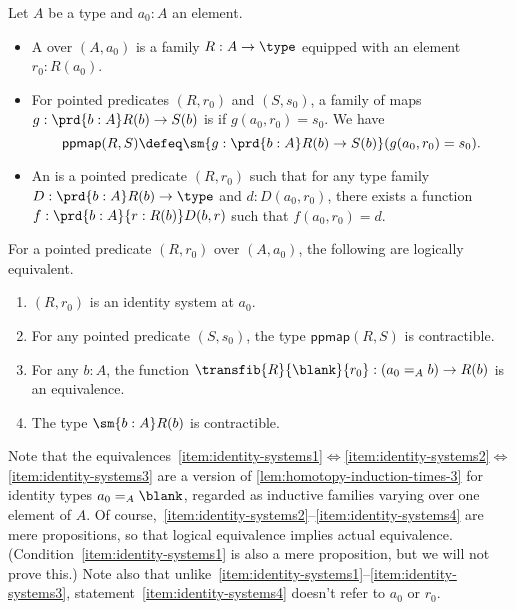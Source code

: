 \begin{defn}\label{defn:identity-systems}
  Let $A$ be a type and $a_0:A$ an element.
  \begin{itemize}
  \item A 
    over $(A,a_0)$ is a family $R:A\to\type$ equipped with an element $r_0:R(a_0)$.
  \item For pointed predicates $(R,r_0)$ and $(S,s_0)$, a family of maps $g:\prd{b:A} R(b) \to S(b)$ is  if $g(a_0, r_0)=s_0$.
    We have
    \[ \mathsf{ppmap}(R,S) \defeq \sm{g:\prd{b:A} R(b) \to S(b)} (g(a_0, r_0)=s_0).\]
  \item An 
    is a pointed predicate $(R,r_0)$ such that for any type family $D:\prd{b:A} R(b) \to \type$ and $d:D(a_0,r_0)$, there exists a function $f:\prd{b:A}{r:R(b)} D(b,r)$ such that $f(a_0,r_0)=d$.
\end{itemize}
\end{defn}

\begin{thm}\label{thm:identity-systems}
  For a pointed predicate $(R,r_0)$ over $(A,a_0)$, the following are logically equivalent.
  \begin{enumerate}
  \item $(R,r_0)$ is an identity system at $a_0$.\label{item:identity-systems1}
  \item For any pointed predicate $(S,s_0)$, the type $\mathsf{ppmap}(R,S)$ is contractible.\label{item:identity-systems2}
  \item For any $b:A$, the function $\transfib{R}{\blank}{r_0} : (a_0 =_A b) \to R(b)$ is an equivalence.\label{item:identity-systems3}
  \item The type $\sm{b:A} R(b)$ is contractible.\label{item:identity-systems4}
  \end{enumerate}
\end{thm}

Note that the equivalences~\ref{item:identity-systems1}$\Leftrightarrow$\ref{item:identity-systems2}$\Leftrightarrow$\ref{item:identity-systems3} are a version of \cref{lem:homotopy-induction-times-3} for identity types $a_0 =_A \blank$, regarded as inductive families varying over one element of $A$.
Of course,~\ref{item:identity-systems2}--\ref{item:identity-systems4} are mere propositions, so that logical equivalence implies actual equivalence.
(Condition~\ref{item:identity-systems1} is also a mere proposition, but we will not prove this.)
Note also that unlike~\ref{item:identity-systems1}--\ref{item:identity-systems3}, statement~\ref{item:identity-systems4} doesn't refer to $a_0$ or $r_0$.

